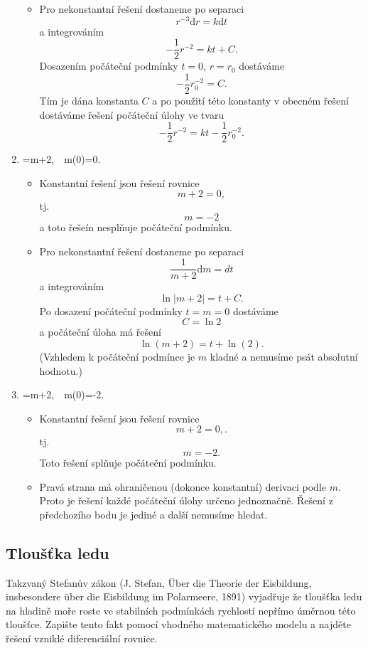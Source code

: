 \begin{enumerate}[(1)]
\begin{itemize}
  \item Pro nekonstantní řešení dostaneme po separaci  $$ r^{-3}\mathrm dr=k\mathrm dt $$ a integrováním $$ -\frac 12 r^{-2}=kt+C.$$ Dosazením počáteční podmínky $t=0$, $r=r_0$ dostáváme $$ -\frac 12 r_0^{-2}=C.$$ Tím je dána konstanta $C$ a po použití této konstanty v obecném řešení dostáváme řešení počáteční úlohy ve tvaru $$ -\frac 12 r^{-2}=kt-\frac 12 r_0^{-2}.$$
  \end{itemize}
\item \priklad {}=m+2,\ \ m(0)=0.
  \begin{itemize}
  \item Konstantní řešení jsou řešení rovnice $$ m+2=0,$$ tj. $$ m=-2$$ a toto řešeín nesplňuje počáteční podmínku.
  \item Pro nekonstantní řešení dostaneme po separaci  $$ \frac1{m+2}\mathrm dm=dt $$ a integrováním $$ \ln|m+2|=t+C.$$ Po dosazení počáteční podmínky $t=m=0$ dostáváme $$C=\ln 2$$ a počáteční úloha má řešení $$\ln(m+2)=t+\ln (2).$$ (Vzhledem k počáteční podmínce je $m$ kladné a nemusíme psát absolutní hodnotu.)
  \end{itemize}
\item \priklad {}=m+2,\ \ m(0)=-2.
  \begin{itemize}
  \item Konstantní řešení jsou řešení rovnice $$ m+2=0,.$$ tj. $$ m=-2.$$ Toto řešení splňuje počáteční podmínku.
  \item Pravá strana má ohraničenou (dokonce konstantní) derivaci podle $m$. Proto je řešení každé počáteční úlohy určeno jednoznačně. Řešení z předchozího bodu je jediné a další nemusíme hledat.
  \end{itemize}
\end{enumerate}

\konec

\subsection{Tloušťka ledu}

Takzvaný Stefanův zákon (J. Stefan, \"Uber die Theorie der Eisbildung, insbesondere \"uber die Eisbildung im Polarmeere, 1891) vyjadřuje že tloušťka ledu na hladině moře roste ve
stabilních podmínkách rychlostí nepřímo úměrnou této tloušťce. Zapište
tento fakt pomocí vhodného matematického modelu a najděte řešení
vzniklé diferenciální rovnice.

\reseni

